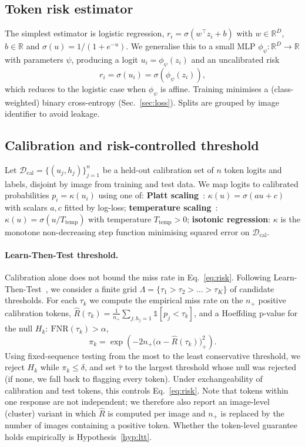 \documentclass[11pt]{article}
\newcommand{\R}{\mathbb{R}}
\begin{document}
\subsection{Token risk estimator}
The simplest estimator is logistic regression, $r_i = \sigma(w^\top z_i + b)$ with $w\in\R^D$, $b\in\R$ and $\sigma(u)=1/(1+e^{-u})$. We generalise this to a small MLP $\phi_\psi:\R^D\to\R$ with parameters $\psi$, producing a logit $u_i = \phi_\psi(z_i)$ and an uncalibrated risk
\begin{equation}
r_i = \sigma(u_i) = \sigma(\phi_\psi(z_i)),
\end{equation}
which reduces to the logistic case when $\phi_\psi$ is affine. Training minimises a (class-weighted) binary cross-entropy (Sec.~\ref{sec:loss}). Splits are grouped by image identifier to avoid leakage.

\subsection{Calibration and risk-controlled threshold}
Let $\mathcal D_{\text{cal}} = \{(u_j, h_j)\}_{j=1}^{n}$ be a held-out calibration set of $n$ token logits and labels, disjoint by image from training and test data. We map logits to calibrated probabilities $p_i = \kappa(u_i)$ using one of:
\textbf{Platt scaling}~\cite{platt1999probabilistic}: $\kappa(u)=\sigma(a u + c)$ with scalars $a,c$ fitted by log-loss;
\textbf{temperature scaling}~\cite{guo2017calibration}: $\kappa(u)=\sigma(u/T_{\text{temp}})$ with temperature $T_{\text{temp}}>0$;
\textbf{isotonic regression}: $\kappa$ is the monotone non-decreasing step function minimising squared error on $\mathcal D_{\text{cal}}$.

\paragraph{Learn-Then-Test threshold.} Calibration alone does not bound the miss rate in Eq.~\eqref{eq:risk}. Following Learn-Then-Test~\cite{angelopoulos2025ltt}, we consider a finite grid $\Lambda = \{\tau_1 > \tau_2 > \dots > \tau_K\}$ of candidate thresholds. For each $\tau_k$ we compute the empirical miss rate on the $n_+$ positive calibration tokens, $\widehat{R}(\tau_k) = \frac{1}{n_+}\sum_{j:h_j=1}\mathbb 1[p_j<\tau_k]$, and a Hoeffding p-value for the null $H_k:\ \mathrm{FNR}(\tau_k) > \alpha$,
\begin{equation}
\pi_k = \exp\!\left(-2 n_+ \big(\alpha - \widehat R(\tau_k)\big)_+^2\right).
\end{equation}
Using fixed-sequence testing from the most to the least conservative threshold, we reject $H_k$ while $\pi_k \le \delta$, and set $\hat\tau$ to the largest threshold whose null was rejected (if none, we fall back to flagging every token). Under exchangeability of calibration and test tokens, this controls Eq.~\eqref{eq:risk}. Note that tokens within one response are not independent; we therefore also report an image-level (cluster) variant in which $\widehat R$ is computed per image and $n_+$ is replaced by the number of images containing a positive token. Whether the token-level guarantee holds empirically is Hypothesis~\ref{hyp:ltt}.
\end{document}
